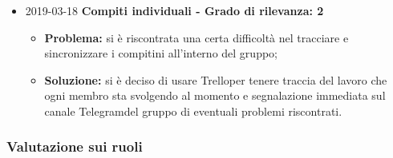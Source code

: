 \begin{itemize}
		\item 2019-03-18 \textbf{Compiti individuali - Grado di rilevanza: 2} \\
		\begin{itemize}
			\item \textbf{Problema:} si è riscontrata una certa difficoltà nel tracciare e sincronizzare i compitini all'interno del gruppo;
			\item \textbf{Soluzione:} si è deciso di usare Trello\glosp per tenere traccia del lavoro che ogni membro sta svolgendo al momento e segnalazione immediata sul canale Telegram\glosp del gruppo di eventuali problemi riscontrati.
		\end{itemize}
		 		
\end{itemize}

\subsubsection{Valutazione sui ruoli}
